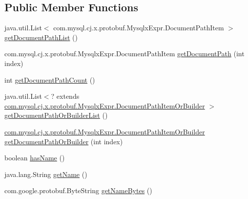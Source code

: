 \subsection*{Public Member Functions}
\begin{DoxyCompactItemize}
\item 
java.\+util.\+List$<$ com.\+mysql.\+cj.\+x.\+protobuf.\+Mysqlx\+Expr.\+Document\+Path\+Item $>$ \mbox{\hyperlink{interfacecom_1_1mysql_1_1cj_1_1x_1_1protobuf_1_1_mysqlx_expr_1_1_column_identifier_or_builder_a8b2116db4e4ab10ab1d2c1280a3caeb2}{get\+Document\+Path\+List}} ()
\item 
com.\+mysql.\+cj.\+x.\+protobuf.\+Mysqlx\+Expr.\+Document\+Path\+Item \mbox{\hyperlink{interfacecom_1_1mysql_1_1cj_1_1x_1_1protobuf_1_1_mysqlx_expr_1_1_column_identifier_or_builder_afc7fad42604b468396fdc8b941d5b1e7}{get\+Document\+Path}} (int index)
\item 
int \mbox{\hyperlink{interfacecom_1_1mysql_1_1cj_1_1x_1_1protobuf_1_1_mysqlx_expr_1_1_column_identifier_or_builder_a36541501a9b862ae8ce461d877991d52}{get\+Document\+Path\+Count}} ()
\item 
java.\+util.\+List$<$? extends \mbox{\hyperlink{interfacecom_1_1mysql_1_1cj_1_1x_1_1protobuf_1_1_mysqlx_expr_1_1_document_path_item_or_builder}{com.\+mysql.\+cj.\+x.\+protobuf.\+Mysqlx\+Expr.\+Document\+Path\+Item\+Or\+Builder}} $>$ \mbox{\hyperlink{interfacecom_1_1mysql_1_1cj_1_1x_1_1protobuf_1_1_mysqlx_expr_1_1_column_identifier_or_builder_a675558ddb7670a2ec9d93611571f7e46}{get\+Document\+Path\+Or\+Builder\+List}} ()
\item 
\mbox{\hyperlink{interfacecom_1_1mysql_1_1cj_1_1x_1_1protobuf_1_1_mysqlx_expr_1_1_document_path_item_or_builder}{com.\+mysql.\+cj.\+x.\+protobuf.\+Mysqlx\+Expr.\+Document\+Path\+Item\+Or\+Builder}} \mbox{\hyperlink{interfacecom_1_1mysql_1_1cj_1_1x_1_1protobuf_1_1_mysqlx_expr_1_1_column_identifier_or_builder_afc80701b261beb5b6bc65507a5c5e351}{get\+Document\+Path\+Or\+Builder}} (int index)
\item 
boolean \mbox{\hyperlink{interfacecom_1_1mysql_1_1cj_1_1x_1_1protobuf_1_1_mysqlx_expr_1_1_column_identifier_or_builder_a4b44da81972c99b2c012482c86c4c054}{has\+Name}} ()
\item 
java.\+lang.\+String \mbox{\hyperlink{interfacecom_1_1mysql_1_1cj_1_1x_1_1protobuf_1_1_mysqlx_expr_1_1_column_identifier_or_builder_a3df29d418778a2ccabf16080a32ba3e0}{get\+Name}} ()
\item 
com.\+google.\+protobuf.\+Byte\+String \mbox{\hyperlink{interfacecom_1_1mysql_1_1cj_1_1x_1_1protobuf_1_1_mysqlx_expr_1_1_column_identifier_or_builder_a163173bc5ee4ad0091b723b0babd8336}{get\+Name\+Bytes}} ()

\end{DoxyCompactItemize}
